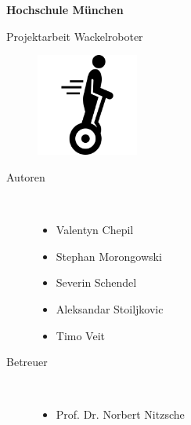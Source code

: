 \begin{titlepage}
\begin{flushleft}
\begin{Huge}
\textbf{Hochschule München}
\par\medskip
Projektarbeit Wackelroboter
\end{Huge}
\begin{large}
\par\vspace{5cm}
\begin{figure}[h]
\centering\includegraphics[width=0.3\textwidth]{images/segwayIcon.png}

\end{figure}

\par\vspace{5cm}

\begin{description}
\item[Autoren]~\par
\begin{itemize}
\item Valentyn Chepil
\item Stephan Morongowski
\item Severin Schendel
\item Aleksandar Stoiljkovic
\item Timo Veit
\end{itemize}
\end{description}


\begin{description}
\item[Betreuer]~\par
\begin{itemize}
\item Prof. Dr. Norbert Nitzsche
\end{itemize}
\end{description}


\end{large}
\end{flushleft}


\vfill %
\end{titlepage}
\restoregeometry
